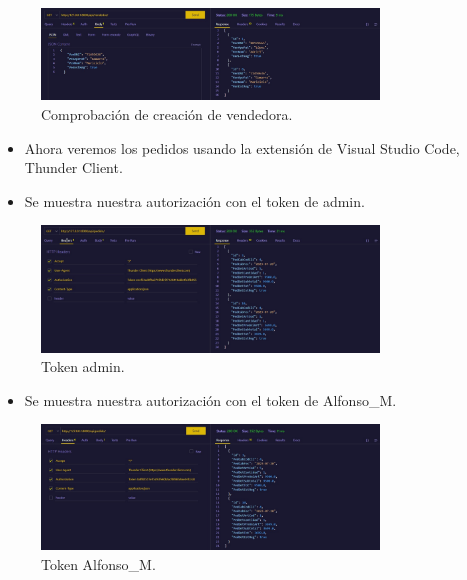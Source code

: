 \documentclass{article}
\begin{document}
    \begin{figure}[H]
		\centering
        \includegraphics[width=0.8\textwidth,keepaspectratio]{img/b15.jpeg}
		\caption{Comprobación de creación de vendedora.}
    \end{figure}
    \begin{itemize}
        \item Ahora veremos los pedidos usando la extensión de Visual Studio Code, Thunder Client.
        \item Se muestra nuestra autorización con el token de admin.
    \end{itemize}
    \begin{figure}[H]
		\centering
        \includegraphics[width=0.8\textwidth,keepaspectratio]{img/b16.jpeg}
		\caption{Token admin.}
    \end{figure}
    \begin{itemize}
        \item Se muestra nuestra autorización con el token de Alfonso\_M.
    \end{itemize}
    \begin{figure}[H]
		\centering
        \includegraphics[width=0.8\textwidth,keepaspectratio]{img/b17.jpeg}
		\caption{Token Alfonso_M.}
    \end{figure}
\end{document}
